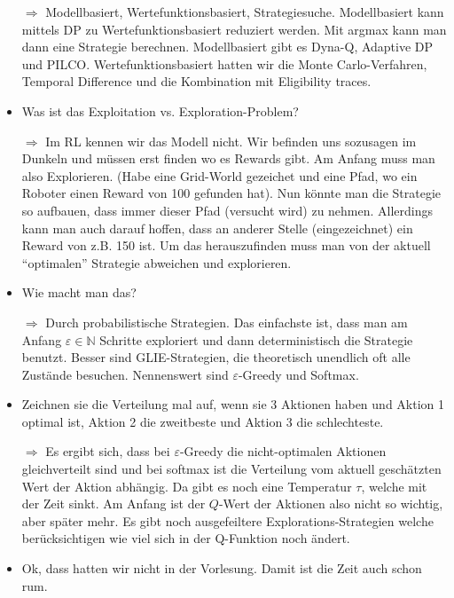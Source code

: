 \documentclass[a4paper]{article}
\begin{document}
\begin{itemize}
        \item[$\Rightarrow$] Modellbasiert, Wertefunktionsbasiert, Strategiesuche.
                             Modellbasiert kann mittels DP zu Wertefunktionsbasiert
                             reduziert werden. Mit argmax kann man dann eine Strategie
                             berechnen. Modellbasiert gibt es Dyna-Q,
                             Adaptive DP und PILCO. Wertefunktionsbasiert
                             hatten wir die Monte Carlo-Verfahren,
                             Temporal Difference und die Kombination mit
                             Eligibility traces.
        \item Was ist das Exploitation vs. Exploration-Problem?
        \item[$\Rightarrow$] Im RL kennen wir das Modell nicht. Wir befinden
        uns sozusagen im Dunkeln und müssen erst finden wo es Rewards gibt.
        Am Anfang muss man also Explorieren. (Habe eine Grid-World gezeichet
        und eine Pfad, wo ein Roboter einen Reward von 100 gefunden hat). Nun
        könnte man die Strategie so aufbauen, dass immer dieser Pfad
        (versucht wird) zu nehmen. Allerdings kann man auch darauf hoffen, dass
        an anderer Stelle (eingezeichnet) ein Reward von z.B. 150 ist. Um
        das herauszufinden muss man von der aktuell \enquote{optimalen} Strategie
        abweichen und explorieren.
        \item Wie macht man das?
        \item[$\Rightarrow$] Durch probabilistische Strategien. Das einfachste
        ist, dass man am Anfang $\varepsilon \in \mathbb{N}$ Schritte exploriert
        und dann deterministisch die Strategie benutzt. Besser sind GLIE-Strategien,
        die theoretisch unendlich oft alle Zustände besuchen. Nennenswert sind
        $\varepsilon$-Greedy und Softmax.
        \item Zeichnen sie die Verteilung mal auf, wenn sie 3 Aktionen haben
              und Aktion 1 optimal ist, Aktion 2 die zweitbeste und Aktion 3
              die schlechteste.
        \item[$\Rightarrow$] Es ergibt sich, dass bei $\varepsilon$-Greedy
        die nicht-optimalen Aktionen gleichverteilt sind und bei 
        softmax ist die Verteilung vom aktuell geschätzten Wert der Aktion
        abhängig. Da gibt es noch eine Temperatur $\tau$, welche mit der
        Zeit sinkt. Am Anfang ist der $Q$-Wert der Aktionen also nicht so
        wichtig, aber später mehr. Es gibt noch ausgefeiltere Explorations-Strategien
        welche berücksichtigen wie viel sich in der Q-Funktion noch ändert.
        \item Ok, dass hatten wir nicht in der Vorlesung. Damit ist die
        Zeit auch schon rum.
    \end{itemize}
\end{document}
